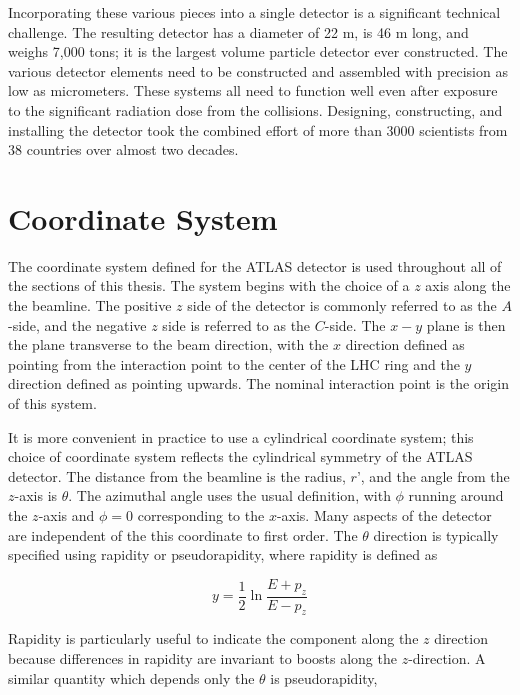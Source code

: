 Incorporating these various pieces into a single detector is a significant technical challenge.
The resulting detector has a diameter of 22 m, is 46 m long, and weighs 7,000 tons; it is the largest volume particle detector ever constructed.
The various detector elements need to be constructed and assembled with precision as low as micrometers.
These systems all need to function well even after exposure to the significant radiation dose from the collisions.
Designing, constructing, and installing the detector took the combined effort of more than 3000 scientists from 38 countries over almost two decades.


\section{Coordinate System}

The coordinate system defined for the ATLAS detector is used throughout all of the sections of this thesis.
The system begins with the choice of a $z$ axis along the the beamline.
The positive $z$ side of the detector is commonly referred to as the $A$-side, and the negative $z$ side is referred to as the $C$-side.
The $x-y$ plane is then the plane transverse to the beam direction, with the $x$ direction defined as pointing from the interaction point to the center of the \ac{LHC} ring and the $y$ direction defined as pointing upwards.
The nominal interaction point is the origin of this system.

It is more convenient in practice to use a cylindrical coordinate system; this choice of coordinate system reflects the cylindrical symmetry of the ATLAS detector.
The distance from the beamline is the radius, $r$', and the angle from the $z$-axis is $\theta$.
The azimuthal angle uses the usual definition, with $\phi$ running around the $z$-axis and $\phi = 0$ corresponding to the $x$-axis.
Many aspects of the detector are independent of the this coordinate to first order.
The $\theta$ direction is typically specified using rapidity or pseudorapidity, where rapidity is defined as

\begin{equation}\label{eq:rapidity}
y = \frac{1}{2} \ln \frac{E + p_z}{E - p_z}
\end{equation}

\noindent Rapidity is particularly useful to indicate the component along the $z$ direction because differences in rapidity are invariant to boosts along the $z$-direction.
A similar quantity which depends only the $\theta$ is pseudorapidity, 

